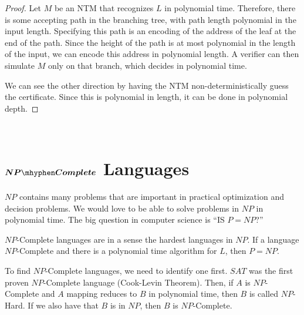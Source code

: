 \begin{proof}
	Let $M$ be an NTM that recognizes $L$ in polynomial time.  Therefore, there is some accepting path in the branching tree, with path length polynomial in the input length.  Specifying this path is an encoding of the address of the leaf at the end of the path.  Since the height of the path is at most polynomial in the length of the input, we can encode this address in polynomial length.  A verifier can then simulate $M$ only on that branch, which decides in polynomial time.
	
	We can see the other direction by having the NTM non-deterministically guess the certificate.  Since this is polynomial in length, it can be done in polynomial depth.
\end{proof}\\


\section*{$\boldsymbol{NP\mhyphen Complete}$ Languages}
$NP$ contains many problems that are important in practical optimization and decision problems.  We would love to be able to solve problems in $NP$ in polynomial time.  The big question in computer science is ``IS $P=NP$?''

$NP$-Complete languages are in a sense the hardest languages in $NP$.  If a language $NP$-Complete and there is a polynomial time algorithm for $L$, then $P=NP$.


To find $NP$-Complete languages, we need to identify one first.  $SAT$ was the first proven $NP$-Complete language (Cook-Levin Theorem).  Then, if $A$ is $NP$-Complete and $A$ mapping reduces to $B$ in polynomial time, then $B$ is called $NP$-Hard.  If we also have that $B$ is in $NP$, then $B$ is $NP$-Complete.



